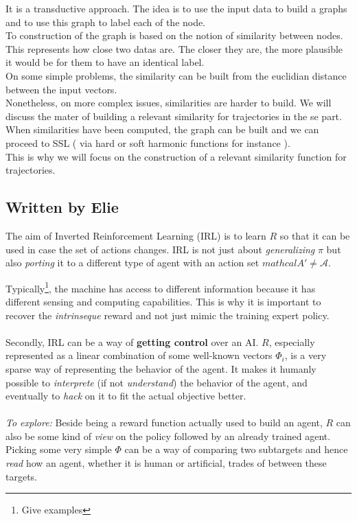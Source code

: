 \documentclass{article}
\begin{document}
It is a transductive approach. 
The idea is to use the input data to build a graphs and to use this graph to label each of the node. \\
To construction of the graph is based on the notion of similarity between nodes.\\ This represents how close two datas are. The closer they are, the more plausible it would be for them to have an identical label.\\
On some simple problems, the similarity can be built from the euclidian distance between the input vectors.\\
Nonetheless, on more complex issues, similarities are harder to build. We will discuss the mater of building a relevant similarity for trajectories in the se part.
When similarities have been computed, the graph can be built and we can proceed to SSL ( via hard or soft harmonic functions for instance ).\\
This is why we will focus on the construction of a relevant similarity function for trajectories.


\subsection{Written by Elie}
The aim of Inverted Reinforcement Learning (IRL) is to learn $R$ so that it can be used in case the set of actions changes. IRL is not just about \emph{generalizing} $\pi$ but also \emph{porting} it to a different type of agent with an action set $mathcal A' \neq \mathcal A$. %

Typically\footnote{Give examples}, the machine has access to different information because it has different sensing and computing capabilities. This is why it is important to recover the \emph{intrinseque} reward and not just mimic the training expert policy.

\paragraph{}
Secondly, IRL can be a way of \textbf{getting control} over an AI. $R$, especially represented as a linear combination of some well-known vectors $\Phi_i$, is a very sparse way of representing the behavior of the agent. It makes it humanly possible to \emph{interprete} (if not \emph{understand}) the behavior of the agent, and eventually to \emph{hack} on it to fit the actual objective better.

\paragraph{}
\emph{To explore:} Beside being a reward function actually used to build an agent, $R$ can also be some kind of \emph{view} on the policy followed by an already trained agent. Picking some very simple $\Phi$ can be a way of comparing two subtargets and hence \emph{read} how an agent, whether it is human or artificial, trades of between these targets.
\end{document}
